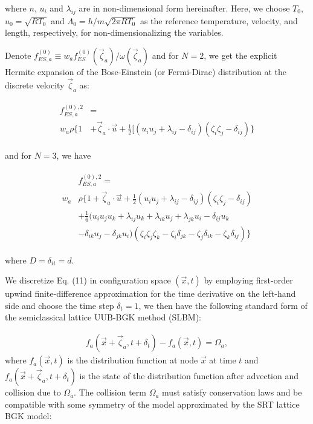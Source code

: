 \documentclass[doublecol]{epl2}
\begin{document}
where $n$, $u_{i}$ and $\lambda_{i j}$ are in non-dimensional form hereinafter.  Here, we choose $T_0$, $u_0=\sqrt{ RT_0}$ and $\Lambda_0=h/m\sqrt{2\pi RT_0}$ as the reference temperature, velocity, and length, respectively, for non-dimensionalizing the variables.

Denote $f_{ES,a}^{(0)} \equiv w_{a} f^{(0)}_{ES}(\vec\zeta_a )/{\omega(\vec\zeta_a )}$ and for $N=2$, we get the explicit Hermite expansion of the Bose-Einstein (or Fermi-Dirac) distribution at the discrete velocity $\vec \zeta_a$ as:

\begin{align}
\begin{split}
f_{ES,a}^{(0),2} &=  \\
w_a \rho \{ 1 &+ \vec \zeta_a \cdot \vec u + \frac{1}{2} [( u_i u_j +\lambda_{ij} -\delta_{ij})(\zeta_i \zeta_j - \delta_{ij}) \} 
\end{split}
\end{align}

and for $N=3$, we have

\begin{align}
\begin{split}
&f_{ES,a}^{(0),2} =  \\
w_a &\rho \{ 1 + \vec \zeta_a \cdot \vec u + \frac{1}{2} ( u_i u_j +\lambda_{ij} -\delta_{ij})(\zeta_i \zeta_j - \delta_{ij}) \\
&+ \frac{1}{6} (u_{i} u_{j} u_{k} + \lambda_{i j} u_{k} + \lambda_{i k} u_{j} + \lambda_{j k} u_{i} - \delta_{i j} u_{k} \\ 
&- \delta_{i k} u_{j} - \delta_{j k} u_{i})(\zeta _{i} \zeta _{j} \zeta _{k}-\zeta _{i}\delta_{jk} -\zeta _{j}\delta _{ik} -\zeta _{k} \delta _{ij}) \} 
\end{split}
\end{align}

where $D=\delta_{ii}=d$.

We discretize Eq. (11) in configuration space $(\vec x,t)$ by employing first-order upwind finite-difference approximation for
the time derivative on the left-hand side and choose the time step $\delta_t = 1$, we then have the following standard form of the
semiclassical lattice UUB-BGK method (SLBM):

\begin{align}
f_a(\vec x+ \vec \zeta_a, t+\delta_t)- f_a(\vec x,t)=\Omega_a,
\end{align}
where $f_a(\vec x,t)$ is the distribution function at node $\vec x$ at time $t$ and $f_a(\vec x+ \vec \zeta_a, t+\delta_t)$ is the state of the distribution function after advection and collision due to $\Omega_a$.   The collision term $\Omega_a$ must satisfy conservation laws and be compatible with some symmetry of the model approximated by the SRT lattice BGK model:
\end{document}
